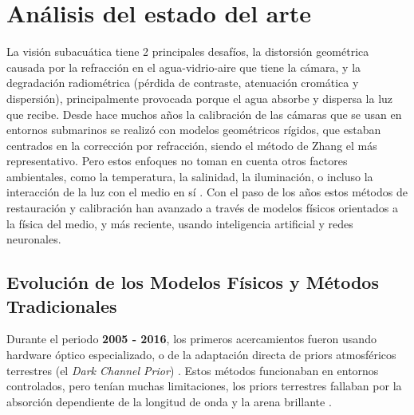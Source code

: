 \documentclass[12pt,letterpaper,spanish,twoside,openright]{report}
\begin{document}
\section{Análisis del estado del arte}

La visión subacuática tiene 2 principales desafíos, la distorsión geométrica causada por la refracción en el agua-vidrio-aire que tiene la cámara, y la degradación radiométrica (pérdida de contraste, atenuación cromática y dispersión), principalmente provocada porque el agua absorbe y dispersa la luz que recibe. Desde hace muchos años la calibración de las cámaras que se usan en entornos submarinos se realizó con modelos geométricos rígidos, que estaban centrados en la corrección por refracción, siendo el método de Zhang \parencite{calZhang} el más representativo. Pero estos enfoques no toman en cuenta otros factores ambientales, como la temperatura, la salinidad, la iluminación, o incluso la interacción de la luz con el medio en sí \parencite{11176009}. Con el paso de los años estos métodos de restauración y calibración han avanzado a través de modelos físicos orientados a la física del medio, y más reciente, usando inteligencia artificial y redes neuronales.

\subsection*{Evolución de los Modelos Físicos y Métodos Tradicionales}

Durante el periodo \textbf{2005 - 2016}, los primeros acercamientos fueron usando hardware óptico especializado, o de la adaptación directa de priors atmosféricos terrestres (el \textit{Dark Channel Prior}) \parencite{rs15194699} \parencite{Ke_2023}. Estos métodos funcionaban en entornos controlados, pero tenían muchas limitaciones, los priors terrestres fallaban por la absorción dependiente de la longitud de onda y la arena brillante \parencite{9020130}.
\end{document}
